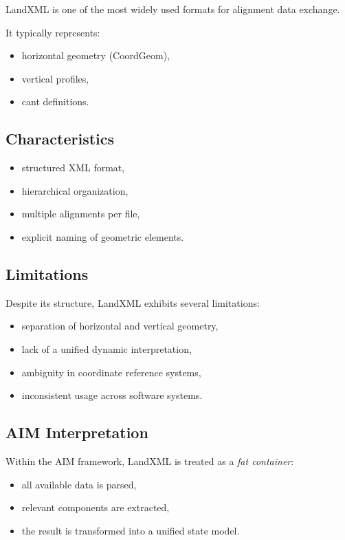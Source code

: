 LandXML is one of the most widely used formats for alignment data
exchange.

It typically represents:
\begin{itemize}
\item horizontal geometry (CoordGeom),
\item vertical profiles,
\item cant definitions.
\end{itemize}

\subsection{Characteristics}

\begin{itemize}
\item structured XML format,
\item hierarchical organization,
\item multiple alignments per file,
\item explicit naming of geometric elements.
\end{itemize}

\subsection{Limitations}

Despite its structure, LandXML exhibits several limitations:
\begin{itemize}
\item separation of horizontal and vertical geometry,
\item lack of a unified dynamic interpretation,
\item ambiguity in coordinate reference systems,
\item inconsistent usage across software systems.
\end{itemize}

\subsection{AIM Interpretation}

Within the AIM framework, LandXML is treated as a \emph{fat container}:
\begin{itemize}
\item all available data is parsed,
\item relevant components are extracted,
\item the result is transformed into a unified state model.
\end{itemize}

